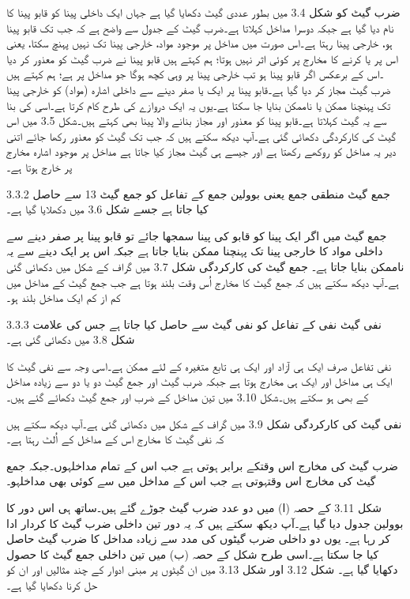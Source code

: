 ضرب گیٹ کو شکل 3.4 میں بطور  عددی گیٹ دکھایا گیا ہے جہاں  ایک داخلی پینا  کو قابو پینا  کا نام دیا گیا ہے جبکہ دوسرا مداخل کہلاتا ہے۔ضرب گیٹ کے جدول سے واضح ہے کہ جب تک قابو پینا   ہو،   خارجی پینا     رہتا ہے۔اس صورت میں   مداخل  پر موجود مواد، خارجی پینا تک نہیں پہنچ سکتا،  یعنی   اس   پر  یا  کرنے کا مخارج پر کوئی اثر نہیں ہوتا؛  ہم کہتے  ہیں قابو پینا نے ضرب گیٹ کو معذور   کر دیا ۔اس کے برعکس اگر قابو پینا   ہو تب خارجی پینا پر وہی کچھ ہوگا جو مداخل پر ہے؛ ہم کہتے  ہیں  ضرب گیٹ مجاز   کر دیا گیا ہے۔قابو پینا پر ایک یا صفر دینے سے داخلی اشارہ  (مواد) کو خارجی پینا تک پہنچنا ممکن یا ناممکن بنایا جا سکتا ہے۔یوں یہ ایک دروازے کی طرح کام کرتا ہے۔اسی  کی بنا  سے یہ  گیٹ  کہلاتا ہے۔قابو پینا کو معذور اور مجاز بنانے والا پینا بھی کہتے ہیں۔شکل 3.5 میں اس  گیٹ کی  کارکردگی دکھائی گئی ہے۔آپ دیکھ سکتے ہیں کہ جب تک گیٹ کو معذور رکھا جائے اتنی دیر یہ مداخل کو  روکھے رکھتا ہے اور جیسے ہی  گیٹ مجاز کیا جاتا ہے   مداخل پر موجود اشارہ  مخارج پر خارج ہوتا ہے۔






3.3.2 جمع گیٹ
	منطقی جمع یعنی بوولین جمع کے تفاعل کو جمع گیٹ 13 سے حاصل کیا جاتا ہے جسے شکل 3.6 میں دکھلایا گیا ہے۔ 

	جمع گیٹ میں اگر ایک پینا کو قابو کی پینا سمجھا جائے تو قابو پینا پر صفر  دینے سے داخلی مواد کا خارجی پینا تک پہنچنا ممکن بنایا جاتا ہے جبکہ اس پر ایک دینے سے یہ ناممکن بنایا جاتا ہے۔
	جمع گیٹ کی کارکردگی شکل 3.7 میں گراف کے شکل میں دکھائی گئی ہے۔آپ دیکھ سکتے ہیں کہ جمع گیٹ کا مخارج اُس وقت بلند ہوتا ہے جب جمع گیٹ کے مداخل میں کم از کم ایک مداخل بلند ہو۔

3.3.3 نفی گیٹ
	نفی کے تفاعل کو نفی گیٹ سے حاصل کیا جاتا ہے جس کی علامت شکل 3.8 میں دکھائی گئی ہے۔

	نفی تفاعل صرف ایک ہی آزاد اور ایک ہی تابع متغیرہ کے لئے ممکن ہے۔اسی وجہ سے نفی گیٹ کا ایک ہی مداخل اور ایک ہی مخارج ہوتا ہے جبکہ ضرب گیٹ اور جمع گیٹ دو یا دو سے زیادہ مداخل کے بھی ہو سکتے ہیں۔شکل 3.10 میں تین مداخل کے ضرب اور جمع گیٹ دکھائے گئے ہیں۔

	نفی گیٹ کی کارکردگی شکل 3.9 میں گراف کے شکل میں دکھائی گئی ہے۔آپ دیکھ سکتے ہیں کہ نفی گیٹ کا مخارج اس کے مداخل کے اُلٹ رہتا ہے۔


	ضرب گیٹ کی مخارج اس وقتکے برابر ہوتی ہے جب اس کے تمام مداخلہوں۔جبکہ جمع گیٹ کی مخارج اس وقتہوتی ہے جب اس کے مداخل میں سے کوئی بھی مداخلہو۔

	شکل 3.11 کے حصہ (ا) میں دو عدد ضرب گیٹ جوڑے گئے ہیں۔ساتھ ہی اس دور کا بوولین جدول دیا گیا ہے۔آپ دیکھ سکتے ہیں کہ یہ دور تین داخلی ضرب گیٹ کا کردار ادا کر رہا ہے۔ یوں دو داخلی ضرب گیٹوں کی مدد سے زیادہ مداخل کا ضرب گیٹ حاصل کیا جا سکتا ہے۔اسی طرح شکل کے حصہ (ب) میں تین داخلی جمع گیٹ کا حصول دکھایا گیا ہے۔ 
	شکل 3.12 اور شکل 3.13 میں ان گیٹوں پر مبنی ادوار کے چند مثالیں اور ان کو حل کرنا دکھایا گیا ہے۔


